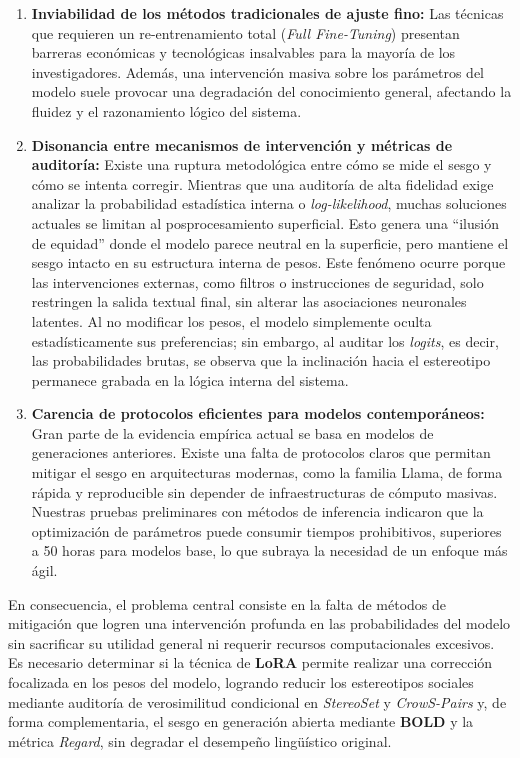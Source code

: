 \documentclass[12pt,a4paper]{report}
\begin{document}
\begin{enumerate}
    \item \textbf{Inviabilidad de los métodos tradicionales de ajuste fino:} Las técnicas que requieren un re-entrenamiento total (\textit{Full Fine-Tuning}) presentan barreras económicas y tecnológicas insalvables para la mayoría de los investigadores. Además, una intervención masiva sobre los parámetros del modelo suele provocar una degradación del conocimiento general, afectando la fluidez y el razonamiento lógico del sistema.
    \item \textbf{Disonancia entre mecanismos de intervención y métricas de auditoría:} Existe una ruptura metodológica entre cómo se mide el sesgo 
    y cómo se intenta corregir. Mientras que una auditoría de alta fidelidad exige analizar la probabilidad estadística interna 
    o \textit{log-likelihood}, muchas soluciones actuales se limitan al posprocesamiento superficial. 
    Esto genera una ``ilusión de equidad'' donde el modelo parece neutral en la superficie, pero mantiene el sesgo intacto en su 
    estructura interna de pesos. Este fenómeno ocurre porque las intervenciones externas, como filtros o instrucciones de seguridad,
    solo restringen la salida textual final, sin alterar las asociaciones neuronales latentes. Al no modificar los pesos, el modelo 
    simplemente oculta estadísticamente sus preferencias; sin embargo, al auditar los \textit{logits}, es decir, las probabilidades brutas,
    se observa que la inclinación hacia el estereotipo permanece grabada en la lógica interna del sistema.
    \item \textbf{Carencia de protocolos eficientes para modelos contemporáneos:} Gran parte de la evidencia empírica actual se 
    basa en modelos de generaciones anteriores. Existe una falta de protocolos claros que permitan mitigar el sesgo en arquitecturas 
    modernas, como la familia Llama, de forma rápida y reproducible sin depender de infraestructuras de cómputo masivas. 
    Nuestras pruebas preliminares con métodos de inferencia indicaron que la optimización de parámetros puede consumir tiempos 
    prohibitivos, superiores a 50 horas para modelos base, lo que subraya la necesidad de un enfoque más ágil.
\end{enumerate}



En consecuencia, el problema central consiste en la falta de métodos de mitigación que logren una intervención profunda en las probabilidades del modelo sin sacrificar su utilidad general ni requerir recursos computacionales excesivos. Es necesario determinar si la técnica de \textbf{LoRA} permite realizar una corrección focalizada en los pesos del modelo, logrando reducir los estereotipos sociales mediante auditoría de verosimilitud condicional en \textit{StereoSet} y \textit{CrowS-Pairs} y, de forma complementaria, el sesgo en generación abierta mediante \textbf{BOLD} y la métrica \textit{Regard}, sin degradar el desempeño lingüístico original.
\end{document}
